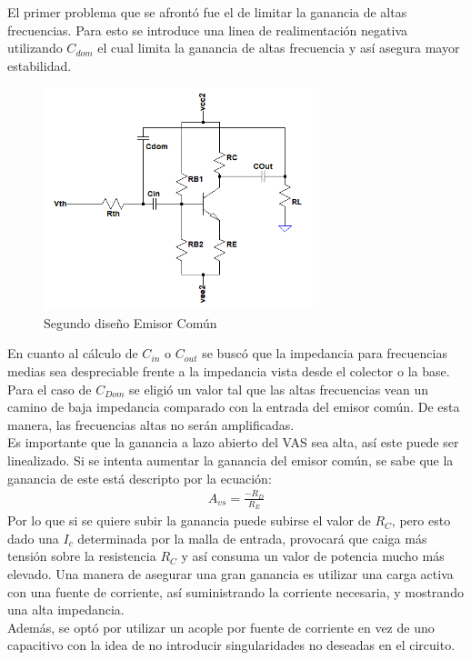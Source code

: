 El primer problema que se afrontó fue el de limitar la ganancia de altas frecuencias.
Para esto se introduce una linea de realimentación negativa utilizando $C_{dom}$ el cual limita la ganancia de altas frecuencia y así asegura mayor estabilidad.
 \begin{figure}[H]
\centering
	\includegraphics[width=0.7\textwidth]{ImagenesGain-Stage/ec2.png}
	\caption{Segundo diseño Emisor Común}
	\label{fig:ec2}
\end{figure}
En cuanto al cálculo de $C_{in}$ o $C_{out}$ se buscó que la impedancia para frecuencias medias sea despreciable frente a la impedancia vista desde el colector o la base.\\
Para el caso de $C_{Dom}$ se eligió un valor tal que las altas frecuencias vean un camino de baja impedancia comparado con la entrada del emisor común. De esta manera, las frecuencias altas no serán amplificadas.\\
Es importante que la ganancia a lazo abierto del VAS sea alta, así este puede ser linealizado. Si se intenta aumentar la ganancia del emisor común, se sabe que la ganancia de este está descripto por la ecuación:
\begin{align}
A_{vs}=\frac{-R_D}{R_E}
\end{align}
Por lo que si se quiere subir la ganancia puede subirse el valor de $R_C$, pero esto dado una $I_c$ determinada por la  malla de entrada, provocará que caiga más tensión sobre la resistencia $R_C$ y así consuma un valor de potencia mucho más elevado. Una manera de asegurar una gran ganancia es utilizar una carga activa con una fuente de corriente, así suministrando la corriente necesaria, y mostrando una alta impedancia. \\
Además, se optó por utilizar un acople por fuente de corriente en vez de uno capacitivo con la idea de no introducir singularidades no deseadas en el circuito.
